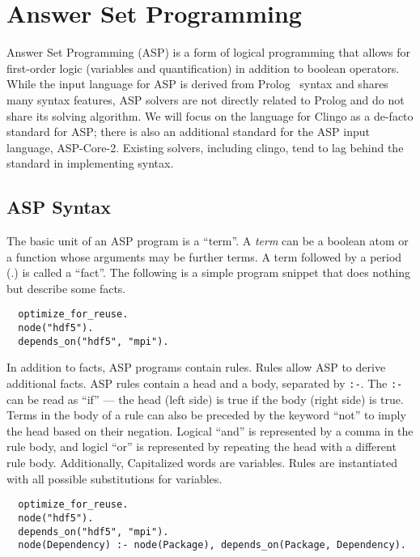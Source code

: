 \section{Answer Set Programming}
\label{sec:asp}

Answer Set Programming (ASP) is a form of logical programming that allows for first-order logic (variables and quantification) in addition to boolean operators.
While the input language for ASP is derived from Prolog~\cite{baral_2003} syntax and shares many syntax features, ASP solvers are not directly related to Prolog and do not share its solving algorithm.
We will focus on the language for Clingo as a de-facto standard for ASP; there is also an additional standard for the ASP input language, ASP-Core-2.
Existing solvers, including clingo, tend to lag behind the standard in implementing syntax.

\subsection{ASP Syntax}

The basic unit of an ASP program is a ``term''.
A \textit{term} can be a boolean atom or a function whose arguments may be further terms.
A term followed by a period (.) is called a ``fact''.
The following is a simple program snippet that does nothing but describe some facts.

\begin{verbatim}
  optimize_for_reuse.
  node("hdf5").
  depends_on("hdf5", "mpi").
\end{verbatim}

In addition to facts, ASP programs contain rules.
Rules allow ASP to derive additional facts.
ASP rules contain a head and a body, separated by \texttt{:-}.
The \texttt{:-} can be read as ``if'' --- the head (left side) is true if the body (right side) is true.
Terms in the body of a rule can also be preceded by the keyword ``not'' to imply the head based on their negation.
Logical ``and'' is represented by a comma in the rule body, and logicl ``or'' is represented by repeating the head with a different rule body.
Additionally, Capitalized words are variables.
Rules are instantiated with all possible substitutions for variables.

\begin{verbatim}
  optimize_for_reuse.
  node("hdf5").
  depends_on("hdf5", "mpi").
  node(Dependency) :- node(Package), depends_on(Package, Dependency).
\end{verbatim}

